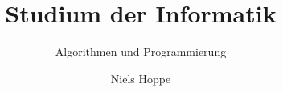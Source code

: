\documentclass[german]{scrbook}
\title{Studium der Informatik}
\subtitle{Algorithmen und Programmierung}
\author{Niels Hoppe}
\begin{document}
\maketitle
\tableofcontents



{}

\end{document}
